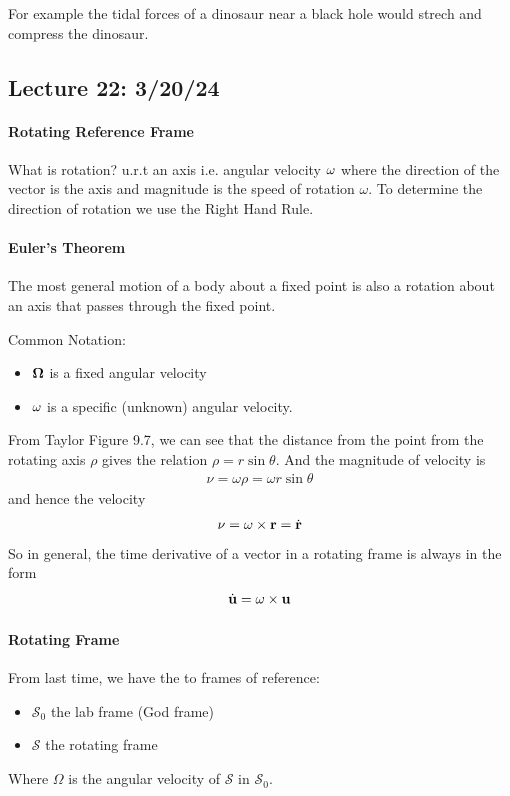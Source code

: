 \documentclass[../main.tex]{subfiles}
\begin{document}
For example the tidal forces of a dinosaur near a black hole would strech and compress the dinosaur.

\newpage
\subsection*{Lecture 22: \hfill 3/20/24}
\paragraph*{Rotating Reference Frame} 

What is rotation? u.r.t an axis i.e. angular velocity $\vb \omega$ where the direction of the vector
is the axis and magnitude is the speed of rotation $\omega$. To determine the direction of rotation
we use the Right Hand Rule. 

\paragraph*{Euler's Theorem} The most general motion of a body about a fixed point is also a
rotation about an axis that passes through the fixed point.

Common Notation:
\begin{itemize}
    \item $\vb \Omega$ is a fixed angular velocity
    \item $\vb \omega$ is a specific (unknown) angular velocity.
\end{itemize}
From Taylor Figure 9.7, we can see that the distance from the point from the rotating axis $\rho$ 
gives the relation $\rho = r \sin\theta$. And the magnitude of velocity is
\begin{align*}
    \nu = \omega \rho = \omega r \sin\theta
\end{align*}
and hence the velocity
\begin{align*}
    \vb \nu = \vb \omega \times \vb r = \dot{\vb r}
\end{align*}
So in general, the time derivative of a vector in a rotating frame is always in the form
\begin{align*}
    \dot{\vb u} = \omega \times \vb u
\end{align*}
\paragraph*{Rotating Frame} From last time, we have the to frames of reference:
\begin{itemize}
    \item $\mathcal{S}_0$ the lab frame (God frame)
    \item $\mathcal{S}$ the rotating frame
\end{itemize}
Where $\Omega$ is the angular velocity of $\mathcal{S}$ in $\mathcal{S}_0$.
\end{document}
